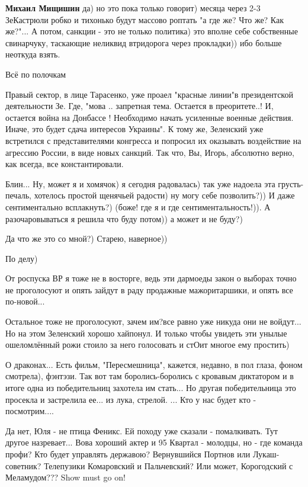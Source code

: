 \begin{itemize}
\begin{itemize}
\textbf{Михаил Мищишин} да) но это пока только говорит) месяца через 2-3 ЗеКастрюли робко и тихонько будут массово роптать "а где же? Что же? Как же?"... А потом, санкции - это не только политика) это вполне себе собственные свинарчуку, таскающие неликвид втридорога через прокладки)) ибо больше неоткуда взять.
\end{itemize} %

Всё по полочкам


Правый сектор, в лице Тарасенко, уже проаел "красные линии"в президентской
деятельности Зе. Где, "мова .. запретная тема. Остается в преоритете..! И,
остается война на Донбассе ! Необходимо начать усиленные военные действия.
Иначе, это будет сдача интересов Украины". К тому же, Зеленский уже встретился
с представителями конгресса и попросил их оказывать воздействие на агрессию
России, в виде новых санкций. Так что, Вы, Игорь, абсолютно верно, как всегда,
все константировали.



Блин... Ну, может я и хомячок) я сегодня радовалась) так уже надоела эта
грусть-печаль, хотелось простой щенячьей радости) ну могу себе позволить?)) И
даже сентиментально всплакнуть?) (боже! где я и где сентиментальность!)). А
разочаровываться я решила что буду потом)) а может и не буду?)

Да что же это со мной?) Старею, наверное))

По делу)

От роспуска ВР я тоже не в восторге, ведь эти дармоеды закон о выборах точно не
проголосуют и опять зайдут в раду продажные мажоритаршики, и опять все
по-новой...

Остальное тоже не проголосуют, зачем им?все равно уже никуда они не войдут...
Но на этом Зеленский хорошо хайпонул. И только чтобы увидеть эти унылые
ошеломлённый рожи стоило за него голосовать и стОит многое ему простить)

О драконах... Есть фильм, "Пересмешница", кажется, недавно, в пол глаза, фоном
смотрела), фэнтэзи. Так вот там боролись-боролись с кровавым диктатором и в
итоге одна из победительниц захотела им стать... Но другая победительница это
просекла и застрелила ее... из лука, стрелой. ... Кто у нас будет кто -
посмотрим....


Да нет, Юля - не птица Феникс. Ей походу уже сказали - помалкивать. Тут другое
назревает... Вова хороший актер и 95 Квартал - молодцы, но - где команда профи?
Кто будет управлять державою? Вернувшийся Портнов или Лукаш-советник?
Телепузики Комаровский и Пальчевский? Или может, Корогодский с Меламудом???
Show must go on!


\end{itemize}
